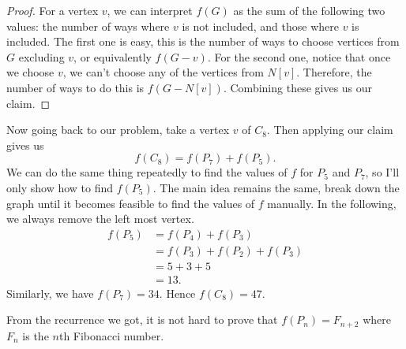\begin{solution}
    \begin{proof}
    For a vertex $v$, we can interpret $f(G)$ as the sum of the following two
    values: the number of ways where $v$ is not included, and those where $v$
    is included. The first one is easy, this is the number of ways to choose
    vertices from $G$ excluding $v$, or equivalently $f(G - v)$. For the second
    one, notice that once we choose $v$, we can't choose any of the vertices
    from $N[v]$. Therefore, the number of ways to do this is $f(G - N[v])$.
    Combining these gives us our claim.
    \end{proof}
    Now going back to our problem, take a vertex $v$ of $C_8$. Then applying
    our claim gives us 
    \[ f(C_8) = f(P_7) + f(P_5). \]
    We can do the same thing repeatedly to find the values of $f$ for $P_5$ and
    $P_7$, so I'll only show how to find $f(P_5)$. The main idea remains the
    same, break down the graph until it becomes feasible to find the values of
    $f$ manually. In the following, we always remove the left most vertex.
    \begin{align*}
    f(P_5) &= f(P_4) + f(P_3)\\
    &= f(P_3) + f(P_2) +f (P_3)\\
    &= 5 + 3 + 5\\
    &= 13.
    \end{align*}
    Similarly, we have $f(P_7) = 34$. Hence $f(C_8) = 47$.
\end{solution}
\begin{remark}
    From the recurrence we got, it is not hard to prove that $f(P_n) = F_{n+2}$
    where $F_n$ is the $n$th Fibonacci number.
\end{remark}

